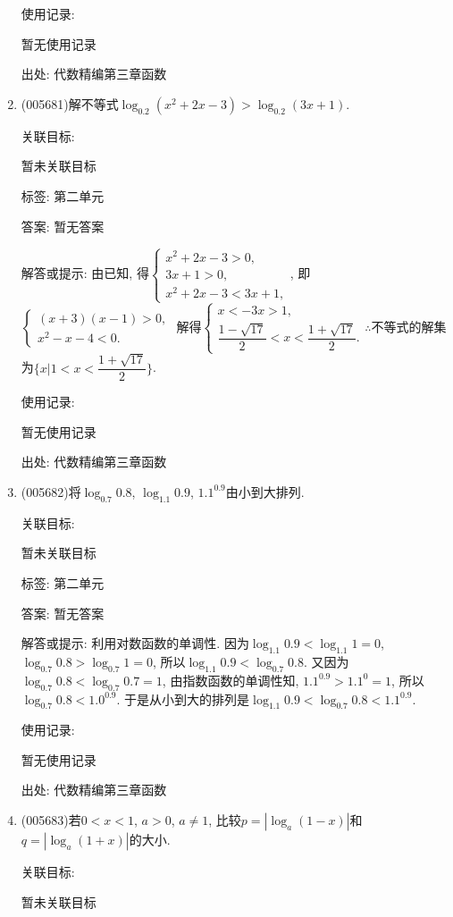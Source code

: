 \documentclass[10pt,a4paper]{article}
\begin{document}
\begin{enumerate}[1.]
使用记录:

暂无使用记录


出处: 代数精编第三章函数
\item { (005681)}解不等式$\log_{0.2}(x^2+2x-3)>\log_{0.2}(3x+1)$.


关联目标:

暂未关联目标



标签: 第二单元

答案: 暂无答案

解答或提示: 由已知, 得$\begin{cases} x^2+2x-3>0, \\ 3x+1>0, \\ x^2+2x-3<3x+1, \end{cases}$, 即$\begin{cases} (x+3)(x-1)>0, \\ x^2-x-4<0. \end{cases}$
解得$\begin{cases} x<-3x>1, \\ \dfrac{1-\sqrt {17}}2<x<\dfrac{1+\sqrt {17}}2. \end{cases}\therefore$不等式的解集为$\{x|1<x<\dfrac{1+\sqrt {17}}2\}$.

使用记录:

暂无使用记录


出处: 代数精编第三章函数
\item { (005682)}将$\log_{0.7}0.8$, $\log_{1.1}0.9$, $1.1^{0.9}$由小到大排列.


关联目标:

暂未关联目标



标签: 第二单元

答案: 暂无答案

解答或提示: 利用对数函数的单调性.
因为$\log_{1.1}0.9<\log_{1.1}1=0$, $\log_{0.7}0.8>\log_{0.7}1=0$, 所以$\log_{1.1}0.9<\log_{0.7}0.8$.
又因为$\log_{0.7}0.8<\log_{0.7}0.7=1$, 由指数函数的单调性知, $1.1^{0.9}>1.1^0=1$, 所以$\log_{0.7}0.8<1.0^{0.9}$.
于是从小到大的排列是$\log_{1.1}0.9<\log_{0.7}0.8<1.1^{0.9}$.

使用记录:

暂无使用记录


出处: 代数精编第三章函数
\item { (005683)}若$0<x<1$, $a>0$, $a\ne 1$, 比较$p=|\log_a(1-x)|$和$q=|\log_a(1+x)|$的大小.


关联目标:

暂未关联目标




\end{enumerate}
\end{document}

